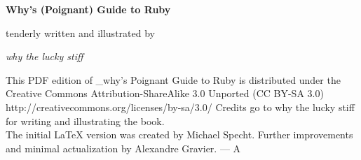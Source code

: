 \documentclass[10pt,twoside]{report}
\renewcommand{\headrulewidth}{0.25pt}
\renewcommand{\headrulewidth}{0pt}
\begin{document}
\pagestyle{empty}
\begin{titlepage}
\begin{center}
\vspace*{2cm}
\normalfont\noindent\bf\Huge{Why's (Poignant) Guide to Ruby}

\vfill

\normalfont\noindent\large{tenderly written and illustrated by}

\vspace*{-0.2cm}

\normalfont\noindent\large{\em why the lucky stiff}
\end{center}
\end{titlepage}
\newpage
\thispagestyle{empty}
\mbox{}

\newpage
\pagestyle{empty}
\begin{center}
\vspace*{4cm}
This PDF edition of \_why's Poignant Guide to Ruby is distributed
under the Creative Commons Attribution-ShareAlike 3.0 Unported 
(CC BY-SA 3.0)
http://creativecommons.org/licenses/by-sa/3.0/
\vfill
Credits go to why the lucky stiff for writing and illustrating the
book.\\
The initial LaTeX version was created by Michael Specht. Further
improvements and minimal actualization by Alexandre Gravier.
\hspace{8.5cm}--- A
\vspace{5cm}
\end{center}
\newpage
\thispagestyle{empty}
\mbox{}

\cleartoevenpage
\setcounter{page}{2}
\setcounter{tocdepth}{1}
\setcounter{secnumdepth}{2}
\begin{spacing}{1.135}
\tableofcontents
\end{spacing}

\newpage

\thispagestyle{empty}

\pagestyle{fancy}

 {
  \renewcommand{\headrulewidth}{0.25pt}
  \fancyhf{}
  \fancyhead[EL,OR]{\thepage}
}
\cleartooddpage
\end{document}
